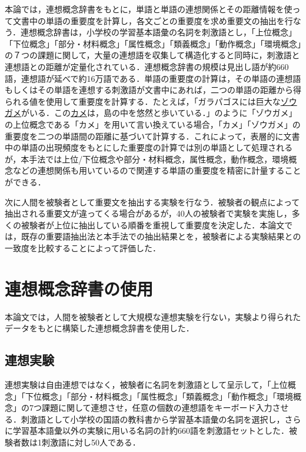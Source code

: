 本論では，連想概念辞書をもとに，単語と単語の連想関係とその距離情報を使って文書中の単語の重要度を計算し，各文ごとの重要度を求め重要文の抽出を行なう．連想概念辞書は，小学校の学習基本語彙の名詞を刺激語とし，「上位概念」「下位概念」「部分・材料概念」「属性概念」「類義概念」「動作概念」「環境概念」の７つの課題に関して，大量の連想語を収集して構造化すると同時に，刺激語と連想語との距離が定量化されている\cite{Okamoto2001}．連想概念辞書の規模は見出し語が約660語，連想語が延べで約16万語である．単語の重要度の計算は，その単語の連想語もしくはその単語を連想する刺激語が文書中にあれば，二つの単語の距離から得られる値を使用して重要度を計算する．たとえば，「ガラパゴスには巨大な\underline{ゾウガメ}がいる．この\underline{カメ}は，島の中を悠然と歩いている．」のように「ゾウガメ」の上位概念である「カメ」を用いて言い換えている場合，「カメ」「ゾウガメ」の重要度を二つの単語間の距離に基づいて計算する．これによって，表層的に文書中の単語の出現頻度をもとにした重要度の計算では別の単語として処理されるが，本手法では上位/下位概念や部分・材料概念，属性概念，動作概念，環境概念などの連想関係も用いているので関連する単語の重要度を精密に計量することができる．

次に人間を被験者として重要文を抽出する実験を行なう．被験者の観点によって抽出される重要文が違ってくる場合があるが，40人の被験者で実験を実施し，多くの被験者が上位に抽出している順番を重視して重要度を決定した．本論文では，既存の重要語抽出法と本手法での抽出結果とを，被験者による実験結果との一致度を比較することによって評価した．



\section{連想概念辞書の使用}

本論文では，人間を被験者として大規模な連想実験を行ない，実験より得られたデータをもとに構築した連想概念辞書\cite{Okamoto1998,Okamoto1999,Okamoto2001}を使用した．

\subsection{連想実験}

連想実験は自由連想ではなく，被験者に名詞を刺激語として呈示して，「上位概念」「下位概念」「部分・材料概念」「属性概念」「類義概念」「動作概念」「環境概念」の7つ課題に関して連想させ，任意の個数の連想語をキーボード入力させる．刺激語として小学校の国語の教科書から学習基本語彙の名詞を選択し，さらに学習基本語彙以外の実験に用いる名詞の計約660語を刺激語セットとした．被験者数は1刺激語に対し50人である．

